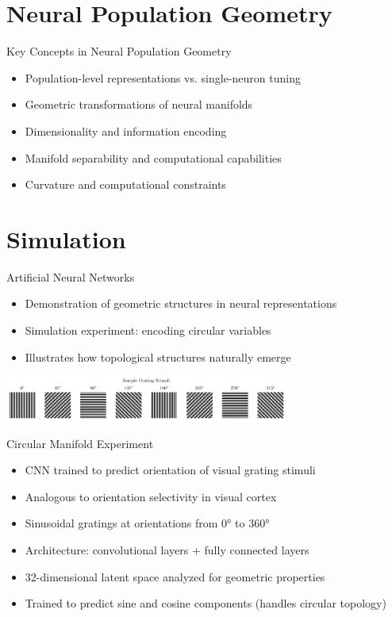 \documentclass[aspectratio=169]{beamer}
\begin{document}
\section{Neural Population Geometry}

\begin{frame}{Key Concepts in Neural Population Geometry}
    \begin{itemize}
        \item Population-level representations vs. single-neuron tuning
        \item Geometric transformations of neural manifolds
        \item Dimensionality and information encoding
        \item Manifold separability and computational capabilities
        \item Curvature and computational constraints
    \end{itemize}
\end{frame}

\section{Simulation}

\begin{frame}{Artificial Neural Networks}
    \begin{itemize}
        \item Demonstration of geometric structures in neural representations
        \item Simulation experiment: encoding circular variables
        \item Illustrates how topological structures naturally emerge
    \end{itemize}
    \includegraphics[width=0.7\textwidth]{results/grating_samples.pdf}
\end{frame}

\begin{frame}{Circular Manifold Experiment}
    \begin{itemize}
        \item CNN trained to predict orientation of visual grating stimuli
        \item Analogous to orientation selectivity in visual cortex
        \item Sinusoidal gratings at orientations from 0° to 360°
        \item Architecture: convolutional layers + fully connected layers
        \item 32-dimensional latent space analyzed for geometric properties
        \item Trained to predict sine and cosine components (handles circular topology)
    \end{itemize}
\end{frame}
\end{document}
